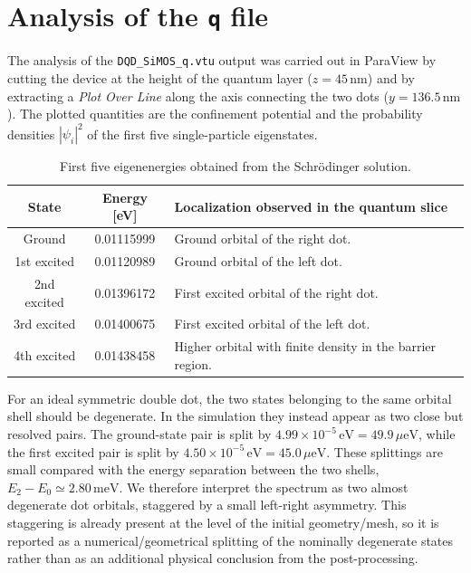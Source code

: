 \section{Analysis of the \texttt{q} file}

The analysis of the \texttt{DQD\_SiMOS\_q.vtu} output was carried out in
ParaView by cutting the device at the height of the quantum layer
(\(z=45\,\mathrm{nm}\)) and by extracting a \textit{Plot Over Line} along the
axis connecting the two dots (\(y=136.5\,\mathrm{nm}\)). The plotted quantities
are the confinement potential and the probability densities \(|\psi_i|^2\) of
the first five single-particle eigenstates.

\begin{table}[H]
\centering
\begin{tabular}{c c p{8.2cm}}
\hline
State & Energy [eV] & Localization observed in the quantum slice \\
\hline
Ground & 0.01115999 & Ground orbital of the right dot. \\
1st excited & 0.01120989 & Ground orbital of the left dot. \\
2nd excited & 0.01396172 & First excited orbital of the right dot. \\
3rd excited & 0.01400675 & First excited orbital of the left dot. \\
4th excited & 0.01438458 & Higher orbital with finite density in the barrier region. \\
\hline
\end{tabular}
\caption{First five eigenenergies obtained from the Schr\"odinger solution.}
\label{tab:q-energies}
\end{table}

For an ideal symmetric double dot, the two states belonging to the same
orbital shell should be degenerate. In the simulation they instead appear as
two close but resolved pairs. The ground-state pair is split by
\(4.99\times10^{-5}\,\mathrm{eV}=49.9\,\mu\mathrm{eV}\), while the first
excited pair is split by
\(4.50\times10^{-5}\,\mathrm{eV}=45.0\,\mu\mathrm{eV}\). These splittings are
small compared with the energy separation between the two shells,
\(E_2-E_0\simeq2.80\,\mathrm{meV}\). We therefore interpret the spectrum as
two almost degenerate dot orbitals, staggered by a small left-right asymmetry.
This staggering is already present at the level of the initial geometry/mesh,
so it is reported as a numerical/geometrical splitting of the nominally
degenerate states rather than as an additional physical conclusion from the
post-processing.

